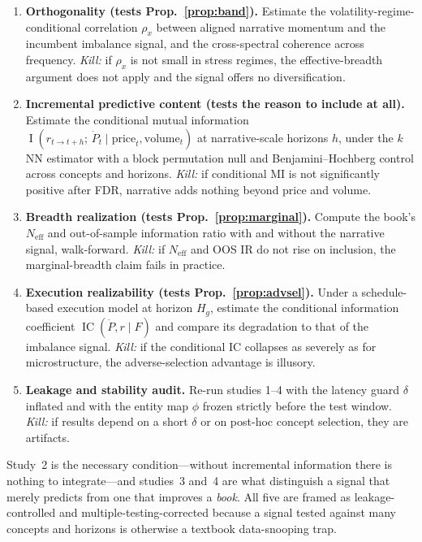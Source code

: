 \documentclass[11pt,a4paper]{article}
\theoremstyle{definition}
\theoremstyle{plain}
\DeclareMathOperator{\IC}{IC}
\DeclareMathOperator{\MI}{I}
\begin{document}
\begin{enumerate}
  \item \textbf{Orthogonality (tests Prop.~\ref{prop:band}).} Estimate the volatility-regime-conditional
        correlation $\rho_x$ between aligned narrative momentum and the incumbent imbalance signal, and
        the cross-spectral coherence across frequency. \emph{Kill:} if $\rho_x$ is not small in stress
        regimes, the effective-breadth argument does not apply and the signal offers no diversification.
  \item \textbf{Incremental predictive content (tests the reason to include at all).} Estimate the
        conditional mutual information $\MI(r_{t\to t+h};\,\dot P_t \mid \text{price}_t,\text{volume}_t)$
        at narrative-scale horizons $h$, under the $k$NN estimator with a block permutation null and
        Benjamini--Hochberg control across concepts and horizons. \emph{Kill:} if conditional MI is not
        significantly positive after FDR, narrative adds nothing beyond price and volume.
  \item \textbf{Breadth realization (tests Prop.~\ref{prop:marginal}).} Compute the book's
        $N_{\mathrm{eff}}$ and out-of-sample information ratio with and without the narrative signal,
        walk-forward. \emph{Kill:} if $N_{\mathrm{eff}}$ and OOS IR do not rise on inclusion, the
        marginal-breadth claim fails in practice.
  \item \textbf{Execution realizability (tests Prop.~\ref{prop:advsel}).} Under a schedule-based
        execution model at horizon $H_g$, estimate the conditional information coefficient
        $\IC(\dot P,r\mid F)$ and compare its degradation to that of the imbalance signal. \emph{Kill:}
        if the conditional IC collapses as severely as for microstructure, the adverse-selection
        advantage is illusory.
  \item \textbf{Leakage and stability audit.} Re-run studies 1--4 with the latency guard $\delta$
        inflated and with the entity map $\phi$ frozen strictly before the test window. \emph{Kill:} if
        results depend on a short $\delta$ or on post-hoc concept selection, they are artifacts.
\end{enumerate}

Study~2 is the necessary condition---without incremental information there is nothing to integrate---and
studies~3 and~4 are what distinguish a signal that merely predicts from one that improves a
\emph{book}. All five are framed as leakage-controlled and multiple-testing-corrected because a signal
tested against many concepts and horizons is otherwise a textbook data-snooping trap.
\end{document}
